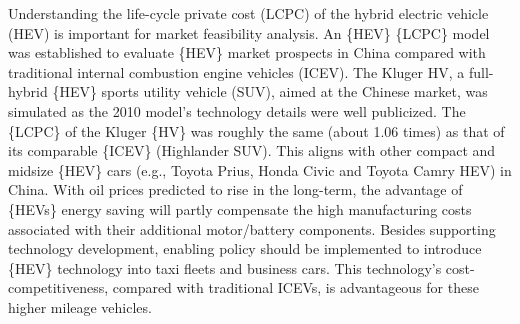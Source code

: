 Understanding the life-cycle private cost (LCPC) of the hybrid electric vehicle (HEV) is important for market feasibility analysis. An \{HEV\} \{LCPC\} model was established to evaluate \{HEV\} market prospects in China compared with traditional internal combustion engine vehicles (ICEV). The Kluger HV, a full-hybrid \{HEV\} sports utility vehicle (SUV), aimed at the Chinese market, was simulated as the 2010 model's technology details were well publicized. The \{LCPC\} of the Kluger \{HV\} was roughly the same (about 1.06 times) as that of its comparable \{ICEV\} (Highlander SUV). This aligns with other compact and midsize \{HEV\} cars (e.g., Toyota Prius, Honda Civic and Toyota Camry HEV) in China. With oil prices predicted to rise in the long-term, the advantage of \{HEVs\} energy saving will partly compensate the high manufacturing costs associated with their additional motor/battery components. Besides supporting technology development, enabling policy should be implemented to introduce \{HEV\} technology into taxi fleets and business cars. This technology's cost-competitiveness, compared with traditional ICEVs, is advantageous for these higher mileage vehicles.